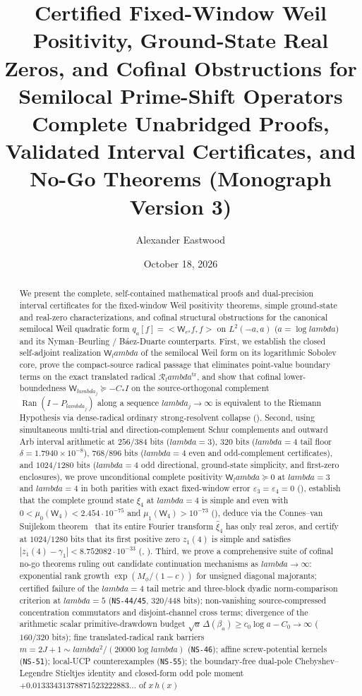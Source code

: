 \documentclass[11pt]{article}
\title{\textbf{Certified Fixed-Window Weil Positivity, Ground-State Real Zeros, and Cofinal Obstructions for Semilocal Prime-Shift Operators}\\[6pt]
\large Complete Unabridged Proofs, Validated Interval Certificates, and No-Go Theorems (Monograph Version 3)}
\author{Alexander Eastwood}
\date{October 18, 2026}
\def\lambda{lambda}%
\def\ip#1#2{<#1,#2>}%
\theoremstyle{remark}
\newcommand{\ip}[2]{\left\langle #1,#2\right\rangle}
\begin{document}
\maketitle

\begin{abstract}
We present the complete, self-contained mathematical proofs and dual-precision interval certificates for the fixed-window Weil positivity theorems, simple ground-state and real-zero characterizations, and cofinal structural obstructions for the canonical semilocal Weil quadratic form $q_a[f]=\ip{\mathsf W_{e^a}f}{f}$ on $L^2(-a,a)$ ($a=\log\lambda$) and its Nyman--Beurling / B\'aez-Duarte counterparts. First, we establish the closed self-adjoint realization $\mathsf W_\lambda$ of the semilocal Weil form on its logarithmic Sobolev core, prove the compact-source radical passage that eliminates point-value boundary terms on the exact translated radical $\mathcal R_\lambda^{\mathrm{tr}}$, and show that cofinal lower-boundedness $\mathsf W_{\lambda_j}\succeq -C_* I$ on the source-orthogonal complement $\operatorname{Ran}(I-P_{\lambda_j})$ along a sequence $\lambda_j\to\infty$ is equivalent to the Riemann Hypothesis via dense-radical ordinary strong-resolvent collapse (). Second, using simultaneous multi-trial and direction-complement Schur complements and outward Arb interval arithmetic at $256/384$ bits ($\lambda=3$), $320$ bits ($\lambda=4$ tail floor $\delta=1.7940\times 10^{-8}$), $768/896$ bits ($\lambda=4$ even and odd-complement certificates), and $1024/1280$ bits ($\lambda=4$ odd directional, ground-state simplicity, and first-zero enclosures), we prove unconditional complete positivity $\mathsf W_\lambda\succeq 0$ at $\lambda=3$ and $\lambda=4$ in both parities with exact fixed-window error $\varepsilon_3=\varepsilon_4=0$ (), establish that the complete ground state $\xi_4$ at $\lambda=4$ is simple and even with $0<\mu_0(\mathsf W_4)<2.454\cdot 10^{-75}$ and $\mu_1(\mathsf W_4)>10^{-73}$ (), deduce via the Connes--van Suijlekom theorem~\cite{ConnesVanSuijlekom2025} that its entire Fourier transform $\widehat{\xi}_4$ has only real zeros, and certify at $1024/1280$ bits that its first positive zero $z_1(4)$ is simple and satisfies $|z_1(4)-\gamma_1|<8.752082\cdot 10^{-33}$ (, ). Third, we prove a comprehensive suite of cofinal no-go theorems ruling out candidate continuation mechanisms as $\lambda\to\infty$: exponential rank growth $\exp(M_\phi/(1-c))$ for unsigned diagonal majorants; certified failure of the $\lambda=4$ tail metric and three-block dyadic norm-comparison criterion at $\lambda=5$ (\texttt{NS-44/45}, $320/448$ bits); non-vanishing source-compressed concentration commutators and disjoint-channel cross terms; divergence of the arithmetic scalar primitive-drawdown budget $\sqrt{a}\,\Delta(\beta_a)\ge c_0\log a-C_0\to\infty$ ($160/320$ bits); fine translated-radical rank barriers $m=2J+1\sim \lambda^2/(20000\log\lambda)$ (\texttt{NS-46}); affine screw-potential kernels (\texttt{NS-51}); local-UCP counterexamples (\texttt{NS-55}); the boundary-free dual-pole Chebyshev--Legendre Stieltjes identity and closed-form odd pole moment $+0.01333431378871523222883\dots$ of $x\,h(x)$ 
\end{abstract}
\end{document}
